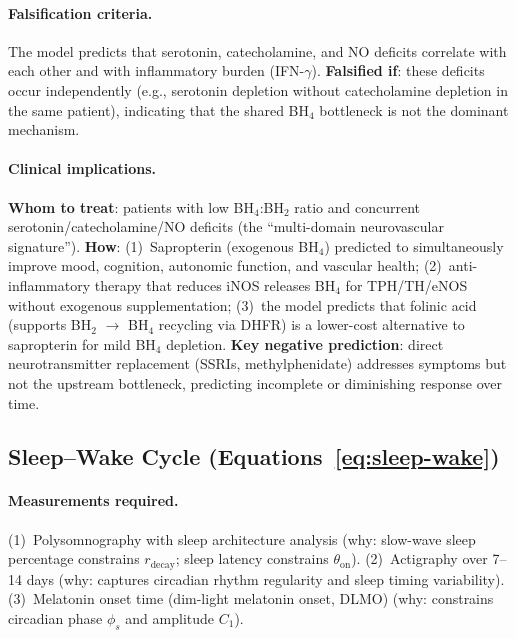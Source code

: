 \paragraph{Falsification criteria.}
The model predicts that serotonin, catecholamine, and NO deficits correlate with each other and with inflammatory burden (IFN-$\gamma$). \textbf{Falsified if}: these deficits occur independently (e.g., serotonin depletion without catecholamine depletion in the same patient), indicating that the shared BH$_4$ bottleneck is not the dominant mechanism.

\paragraph{Clinical implications.}
\textbf{Whom to treat}: patients with low BH$_4$:BH$_2$ ratio and concurrent serotonin/catecholamine/NO deficits (the ``multi-domain neurovascular signature''). \textbf{How}: (1)~Sapropterin (exogenous BH$_4$) predicted to simultaneously improve mood, cognition, autonomic function, and vascular health; (2)~anti-inflammatory therapy that reduces iNOS releases BH$_4$ for TPH/TH/eNOS without exogenous supplementation; (3)~the model predicts that folinic acid (supports BH$_2$ $\to$ BH$_4$ recycling via DHFR) is a lower-cost alternative to sapropterin for mild BH$_4$ depletion. \textbf{Key negative prediction}: direct neurotransmitter replacement (SSRIs, methylphenidate) addresses symptoms but not the upstream bottleneck, predicting incomplete or diminishing response over time.

\subsection{Sleep--Wake Cycle (Equations~\ref{eq:sleep-wake})}

\paragraph{Measurements required.}
(1)~Polysomnography with sleep architecture analysis (why: slow-wave sleep percentage constrains $r_{\text{decay}}$; sleep latency constrains $\theta_{\text{on}}$).
(2)~Actigraphy over 7--14 days (why: captures circadian rhythm regularity and sleep timing variability).
(3)~Melatonin onset time (dim-light melatonin onset, DLMO) (why: constrains circadian phase $\phi_s$ and amplitude $C_1$).

